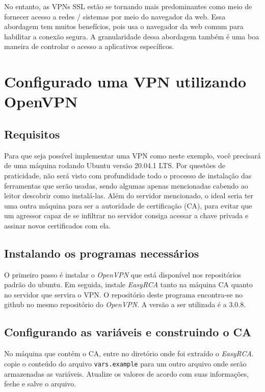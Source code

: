 \documentclass[12pt]{article}
\begin{document}
\begin{flushleft}
No entanto, as VPNs SSL estão se tornando mais predominantes como meio de fornecer acesso a redes / sistemas por meio do navegador da web. Essa abordagem tem muitos benefícios, pois usa o navegador da web comum para habilitar a conexão segura. A granularidade dessa abordagem também é uma boa maneira de controlar o acesso a aplicativos específicos.


\section{Configurado uma VPN utilizando OpenVPN \cite{feilner2006openvpn}} 


\subsection{Requisitos}

Para que seja possível implementar uma VPN como neste exemplo, você precisará
de uma máquina rodando Ubuntu versão 20.04.1 LTS. Por questões de praticidade, não será
visto com profundidade todo o processo de instalação das ferramentas que serão usadas, sendo algumas 
apenas mencionadas cabendo ao leitor descobrir como instalá-las. Além do servidor mencionado,
o ideal seria ter uma outra máquina para ser a autoridade de certificação (CA), para evitar
que um agressor capaz de se infiltrar no servidor consiga acessar a chave privada
e assinar novos certificados com ela. 

\subsection{Instalando os programas necessários}

O primeiro passo é instalar o \emph{OpenVPN} que está disponível nos repositórios padrão do ubuntu.
Em seguida, instale \emph{EasyRCA} tanto na máquina CA quanto no servidor que servira o VPN.
O repositório deste programa encontra-se no github no mesmo repositório do \emph{OpenVPN}. 
A versão a ser utilizada é a 3.0.8. 

\subsection{Configurando as variáveis e construindo o CA}

No máquina que contém o CA, entre no diretório onde foi extraído o \emph{EasyRCA}. copie o conteúdo
do arquivo \texttt{vars.example} para um outro arquivo onde serão armazenadas as variáveis. Atualize
os valores de acordo com suas informações, feche e salve o arquivo. 


\end{flushleft}
\end{document}
